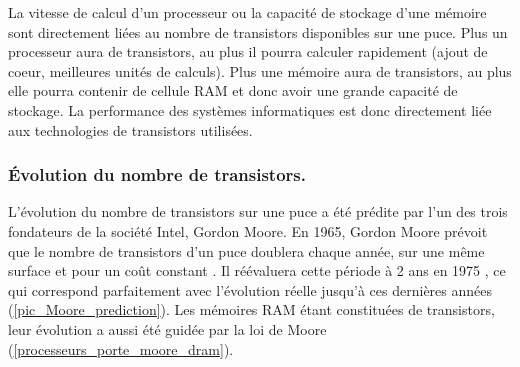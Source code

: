     
    La vitesse de calcul d'un processeur ou la capacité de stockage d'une mémoire sont directement liées au nombre de transistors disponibles sur une puce. 
    Plus un processeur aura de transistors, au plus il pourra calculer rapidement (ajout de coeur, meilleures unités de calculs). Plus une mémoire aura de transistors, au plus elle pourra contenir de cellule RAM et donc avoir une grande capacité de stockage. La performance des systèmes informatiques est donc directement liée aux technologies de transistors utilisées. 
    
    
    \subsubsection{Évolution du nombre de transistors.} \label{sec:moore}
    
        L'évolution du nombre de transistors sur une puce a été prédite par l'un des trois fondateurs de la société Intel, Gordon Moore. En 1965, Gordon Moore prévoit que le nombre de transistors d'un puce doublera chaque année, sur une même surface et pour un coût constant \cite{Moore1998}. Il réévaluera cette période à 2 ans en 1975 \cite{Moore75}, ce qui correspond parfaitement avec l'évolution réelle jusqu'à ces dernières années (\autoref{pic_Moore_prediction}). Les mémoires RAM étant constituées de transistors, leur évolution a aussi été guidée par la loi de Moore (\autoref{processeurs_porte_moore_dram}).
        
        
        
